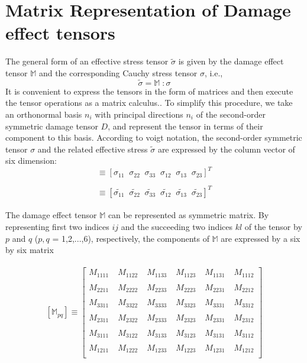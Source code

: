 \documentclass[a4paper,12pt,twoside]{report}
\begin{document}
\section{Matrix Representation of Damage effect tensors}\label{Matrix Representation of Damage effect tensors}
\indent\indent\indent The general form of an effective stress tensor $\tilde{\sigma}$ is given by the damage effect tensor $\mathbb{M}$ and the corresponding Cauchy stress tensor $\sigma$, i.e.,
\begin{equation}
\tilde{\sigma}  = \mathbb{M} \; :  \sigma 
\label{eqn:effective_stress_tensor} 
\end{equation}
It is convenient to express the tensors in the form of matrices and then execute the tensor operations as a matrix calculus.. To simplify this procedure, we take an orthonormal basis ${n_{i}}$ with principal directions $n_{i}$ of the second-order symmetric damage tensor $D$, and represent the tensor in terms of their component to this basis. According to voigt notation, the second-order symmetric tensor $\sigma$ and the related effective stress $\tilde{\sigma}$ are expressed by the column vector of six dimension:
\begin{equation}
   [\sigma_{P}]  \equiv  [\sigma_{11} \;\; \sigma_{22} \;\;\sigma_{33} \;\;\sigma_{12} \;\;\sigma_{13} \;\;\sigma_{23} ]^{T}
\end{equation}

\begin{equation}
   [\tilde{\sigma_{P}}]  \equiv  [\tilde{\sigma_{11}} \;\; \tilde{\sigma_{22}} \;\;\tilde{\sigma_{33}} \;\;\tilde{\sigma_{12}} \;\;\tilde{\sigma_{13}} \;\;\tilde{\sigma_{23}} ]^{T}
\end{equation}
\\
The damage effect tensor $\mathbb{M}$ can be represented as symmetric matrix. By representing first two indices $ij$ and the succeeding two indices $kl$ of the tensor by $p$ and $q$ ($p,q$ = 1,2,...,6), respectively, the components of $\mathbb{M}$
are expressed by a six by six matrix 
\\
\\
$$
[\mathbb{M}_{pq}] \equiv   
 \begin{bmatrix}
  M_{1111}\; & M_{1122}\; & M_{1133}\; & M_{1123}\; & M_{1131}\; & M_{1112} \\
  \\
  M_{2211}\; & M_{2222}\; & M_{2233}\; & M_{2223}\; & M_{2231}\; & M_{2212} \\
   \\
  M_{3311}\; & M_{3322}\; & M_{3333}\; & M_{3323}\; & M_{3331}\; & M_{3312} \\
   \\
  M_{2311}\; & M_{2322}\; & M_{2333}\; & M_{2323}\; & M_{2331}\; & M_{2312} \\
   \\
  M_{3111}\; & M_{3122}\; & M_{3133}\; & M_{3123}\; & M_{3131}\; & M_{3112} \\
   \\
  M_{1211}\; & M_{1222}\; & M_{1233}\; & M_{1223}\; & M_{1231}\; & M_{1212} 
   \\ 
 \end{bmatrix}
  $$
 \\
\end{document}
